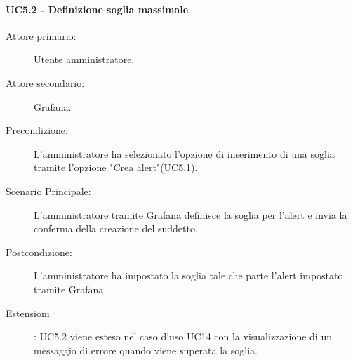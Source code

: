\paragraph{UC5.2 - Definizione soglia massimale}
\label{sssec:uc5.2}
\begin{description}
	\item[Attore primario:] Utente amministratore.
	\item[Attore secondario:] Grafana.
	\item[Precondizione:] L'amministratore ha selezionato l'opzione di inserimento di una soglia tramite l'opzione "Crea alert"(UC5.1).
	\item[Scenario Principale:] L'amministratore tramite Grafana definisce la soglia per l'alert e invia la conferma della creazione del suddetto.
	\item[Postcondizione:] L'amministratore ha impostato la soglia tale che parte l'alert impostato tramite Grafana.
	\item[Estensioni]: UC5.2 viene esteso nel caso d'uso UC14 con la visualizzazione di un messaggio di errore quando viene superata la soglia.
\end{description}
